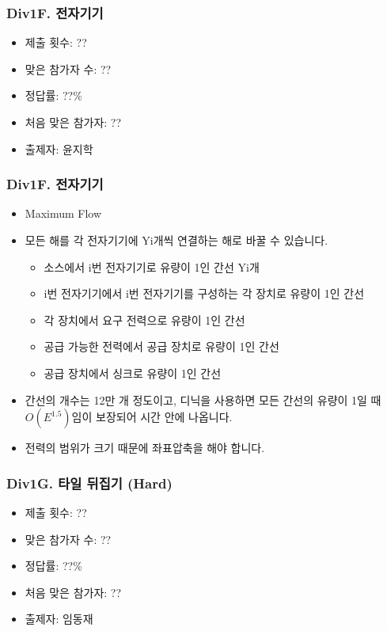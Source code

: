 \documentclass[xetex]{beamer}
\begin{document}
\begin{frame}
  \frametitle{Div1F. 전자기기}
  \begin{itemize}
    \item 제출 횟수: ??
    \item 맞은 참가자 수: ??
    \item 정답률: ??\%
    \item 처음 맞은 참가자: ??
    \item 출제자: 윤지학
  \end{itemize}
\end{frame}

\begin{frame}
  \frametitle{Div1F. 전자기기}
  \begin{itemize}
    \item Maximum Flow
    \item 모든 해를 각 전자기기에 Yi개씩 연결하는 해로 바꿀 수 있습니다.
    \begin{itemize}
      \item 소스에서 i번 전자기기로 유량이 1인 간선 Yi개
      \item i번 전자기기에서 i번 전자기기를 구성하는 각 장치로 유량이 1인 간선
      \item 각 장치에서 요구 전력으로 유량이 1인 간선
      \item 공급 가능한 전력에서 공급 장치로 유량이 1인 간선
      \item 공급 장치에서 싱크로 유량이 1인 간선
    \end{itemize}
    \item 간선의 개수는 12만 개 정도이고, 디닉을 사용하면 모든 간선의 유량이 1일 때 $O(E^{1.5})$임이 보장되어 시간 안에 나옵니다.
    \item 전력의 범위가 크기 때문에 좌표압축을 해야 합니다.
  \end{itemize}
\end{frame}

\begin{frame}
  \frametitle{Div1G. 타일 뒤집기 (Hard)}
  \begin{itemize}
    \item 제출 횟수: ??
    \item 맞은 참가자 수: ??
    \item 정답률: ??\%
    \item 처음 맞은 참가자: ??
    \item 출제자: 임동재
  \end{itemize}
\end{frame}
\end{document}
